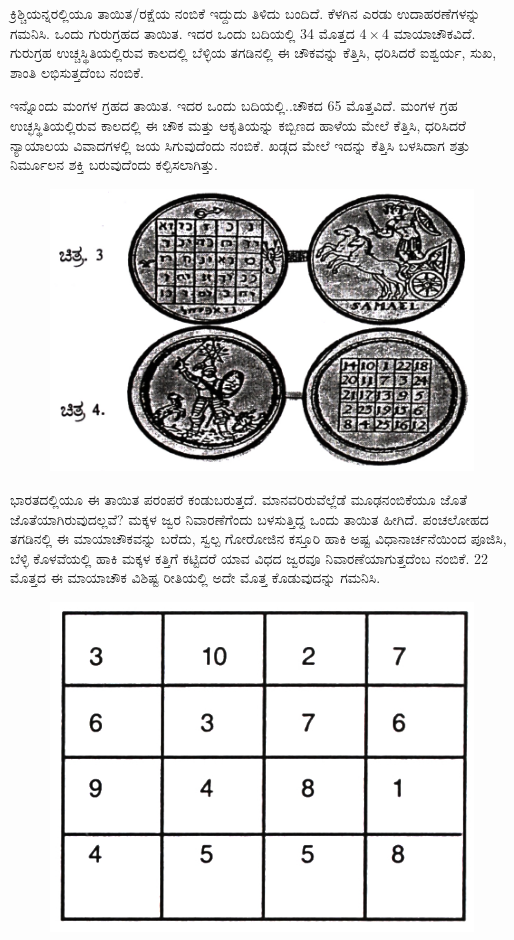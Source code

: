 ಕ್ರಿಶ್ಚಿಯನ್ನರಲ್ಲಿಯೂ ತಾಯಿತ/ರಕ್ಷೆಯ ನಂಬಿಕೆ ಇದ್ದುದು ತಿಳಿದು ಬಂದಿದೆ. ಕೆಳಗಿನ ಎರಡು ಉದಾಹರಣೆಗಳನ್ನು ಗಮನಿಸಿ. ಒಂದು ಗುರುಗ್ರಹದ ತಾಯಿತ. ಇದರ ಒಂದು ಬದಿಯಲ್ಲಿ 34 ಮೊತ್ತದ $4 \times 4$ ಮಾಯಾಚೌಕವಿದೆ. ಗುರುಗ್ರಹ ಉಚ್ಚಸ್ಥಿತಿಯಲ್ಲಿರುವ ಕಾಲದಲ್ಲಿ ಬೆಳ್ಳಿಯ ತಗಡಿನಲ್ಲಿ ಈ ಚೌಕವನ್ನು ಕೆತ್ತಿಸಿ, ಧರಿಸಿದರೆ ಐಶ್ವರ್ಯ, ಸುಖ, ಶಾಂತಿ ಲಭಿಸುತ್ತದೆಂಬ ನಂಬಿಕೆ.

ಇನ್ನೊಂದು ಮಂಗಳ ಗ್ರಹದ ತಾಯಿತ. ಇದರ ಒಂದು ಬದಿಯಲ್ಲಿ..ಚೌಕದ 65 ಮೊತ್ತವಿದೆ. ಮಂಗಳ ಗ್ರಹ ಉಚ್ಛಸ್ಥಿತಿಯಲ್ಲಿರುವ ಕಾಲದಲ್ಲಿ ಈ ಚೌಕ ಮತ್ತು ಆಕೃತಿಯನ್ನು ಕಬ್ಬಿಣದ ಹಾಳೆಯ ಮೇಲೆ ಕೆತ್ತಿಸಿ, ಧರಿಸಿದರೆ ನ್ಯಾಯಾಲಯ ವಿವಾದಗಳಲ್ಲಿ ಜಯ ಸಿಗುವುದೆಂದು ನಂಬಿಕೆ. ಖಡ್ಗದ ಮೇಲೆ ಇದನ್ನು ಕೆತ್ತಿಸಿ ಬಳಸಿದಾಗ ಶತ್ರು ನಿರ್ಮೂಲನ ಶಕ್ತಿ ಬರುವುದೆಂದು ಕಲ್ಪಿಸಲಾಗಿತ್ತು.
\begin{figure}[H]
\includegraphics{src/figures/chap11/fig11-2.jpg}
\end{figure}

ಭಾರತದಲ್ಲಿಯೂ ಈ ತಾಯಿತ ಪರಂಪರೆ ಕಂಡುಬರುತ್ತದೆ. ಮಾನವರಿರುವೆಲ್ಲೆಡೆ ಮೂಢನಂಬಿಕೆಯೂ ಜೊತೆ ಜೊತೆಯಾಗಿರುವುದಲ್ಲವೆ? ಮಕ್ಕಳ ಜ್ವರ ನಿವಾರಣೆಗೆಂದು ಬಳಸುತ್ತಿದ್ದ ಒಂದು ತಾಯಿತ ಹೀಗಿದೆ. ಪಂಚಲೋಹದ ತಗಡಿನಲ್ಲಿ ಈ ಮಾಯಾಚೌಕವನ್ನು ಬರೆದು, ಸ್ವಲ್ಪ ಗೋರೋಜಿನ ಕಸ್ತೂರಿ ಹಾಕಿ ಅಷ್ಟ ವಿಧಾನಾರ್ಚನೆಯಿಂದ ಪೂಜಿಸಿ, ಬೆಳ್ಳಿ ಕೊಳವೆಯಲ್ಲಿ ಹಾಕಿ ಮಕ್ಕಳ ಕತ್ತಿಗೆ ಕಟ್ಟಿದರೆ ಯಾವ ವಿಧದ ಜ್ವರವೂ ನಿವಾರಣೆಯಾಗುತ್ತದೆಂಬ ನಂಬಿಕೆ. 22 ಮೊತ್ತದ ಈ ಮಾಯಾಚೌಕ ವಿಶಿಷ್ಟ ರೀತಿಯಲ್ಲಿ ಅದೇ ಮೊತ್ತ ಕೊಡುವುದನ್ನು ಗಮನಿಸಿ.
\begin{figure}[H]
\includegraphics{src/figures/chap11/fig11-3.jpg}
\end{figure}

